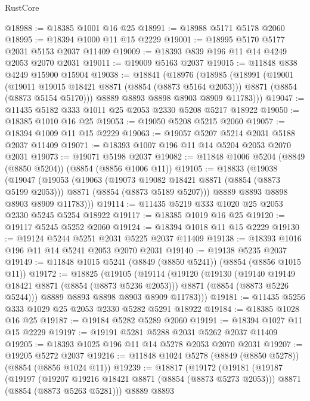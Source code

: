 \begin{lexlean}{RustCore}
\begin{coremodule}
@18988 := @18385 @1001 @16 @25
@18991 := @18988 @5171 @5178 @2060
@18995 := @18394 @1000 @11 @15 @2229
@19001 := @18995 @5170 @5177 @2031 @5153 @2037 @11409
@19009 := @18393 @839 @196 @11 @14 @4249 @2053 @2070 @2031
@19011 := @19009 @5163 @2037
@19015 := @11848 @838 @4249 @15900 @15904
@19038 := @18841
    (@18976
      (@18985
        (@18991
          (@19001
            (@19011 @19015 @18421 @8871 (@8854 (@8873 @5164 @2053)))
            @8871
            (@8854 (@8873 @5154 @5170)))
          @8889
          @8893
          @8898
          @8903
          @8909
          @11783)))
@19047 := @11435 @5182 @333 @1011 @25 @2053 @2330 @5208 @5217 @18922
@19050 := @18385 @1010 @16 @25
@19053 := @19050 @5208 @5215 @2060
@19057 := @18394 @1009 @11 @15 @2229
@19063 := @19057 @5207 @5214 @2031 @5188 @2037 @11409
@19071 := @18393 @1007 @196 @11 @14 @5204 @2053 @2070 @2031
@19073 := @19071 @5198 @2037
@19082 := @11848 @1006 @5204 (@8849 (@8850 @5204)) (@8854 (@8856 @1006 @11))
@19105 := @18833
    (@19038
      (@19047
        (@19053
          (@19063
            (@19073 @19082 @18421 @8871 (@8854 (@8873 @5199 @2053)))
            @8871
            (@8854 (@8873 @5189 @5207)))
          @8889
          @8893
          @8898
          @8903
          @8909
          @11783)))
@19114 := @11435 @5219 @333 @1020 @25 @2053 @2330 @5245 @5254 @18922
@19117 := @18385 @1019 @16 @25
@19120 := @19117 @5245 @5252 @2060
@19124 := @18394 @1018 @11 @15 @2229
@19130 := @19124 @5244 @5251 @2031 @5225 @2037 @11409
@19138 := @18393 @1016 @196 @11 @14 @5241 @2053 @2070 @2031
@19140 := @19138 @5235 @2037
@19149 := @11848 @1015 @5241 (@8849 (@8850 @5241)) (@8854 (@8856 @1015 @11))
@19172 := @18825
    (@19105
      (@19114
        (@19120
          (@19130
            (@19140 @19149 @18421 @8871 (@8854 (@8873 @5236 @2053)))
            @8871
            (@8854 (@8873 @5226 @5244)))
          @8889
          @8893
          @8898
          @8903
          @8909
          @11783)))
@19181 := @11435 @5256 @333 @1029 @25 @2053 @2330 @5282 @5291 @18922
@19184 := @18385 @1028 @16 @25
@19187 := @19184 @5282 @5289 @2060
@19191 := @18394 @1027 @11 @15 @2229
@19197 := @19191 @5281 @5288 @2031 @5262 @2037 @11409
@19205 := @18393 @1025 @196 @11 @14 @5278 @2053 @2070 @2031
@19207 := @19205 @5272 @2037
@19216 := @11848 @1024 @5278 (@8849 (@8850 @5278)) (@8854 (@8856 @1024 @11))
@19239 := @18817
    (@19172
      (@19181
        (@19187
          (@19197
            (@19207 @19216 @18421 @8871 (@8854 (@8873 @5273 @2053)))
            @8871
            (@8854 (@8873 @5263 @5281)))
          @8889
          @8893

\end{coremodule}
\end{lexlean}
